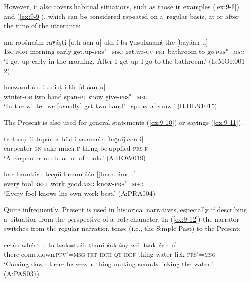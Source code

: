 However, it also covers habitual situations, such as those in examples (\ref{ex:9-8}) and (\ref{ex:9-9}), which can be considered repeated on a~regular basis, at or after the time of the utterance: 

\begin{exe}
\ex
\label{ex:9-8}
\gll ma roošnaám raɣáṣṭi [uth-áan-u] uth-í ba ɣusulxaaná the [bayáan-u] \\
\textsc{1sg.nom} morning early get.up-\textsc{prs"=msg} get.up-\textsc{cv}  \textsc{prt} bathroom to go.\textsc{prs"=msg} \\
\glt `I get up early in the morning. After I get up I go to the bathroom.' (B:MOR001-2)

\ex
\label{ex:9-9}
\gll heewand-á dúu diṣṭ-í kir [d-áan-u] \\
winter-\textsc{ob} two hand.span-\textsc{pl} snow give-\textsc{prs"=msg} \\
\glt `In the winter we [usually] get two hand"=spans of snow.' (B:HLN1015)
\end{exe}

The Present is also used for general statements (\ref{ex:9-10}) or sayings (\ref{ex:9-11}).

\begin{exe}
\ex
\label{ex:9-10}
\gll tarkaaṇ-íi dapáara bíiḍ-i saamaán [laɡaiǰ-éen-i]  \\
carpenter-\textsc{gn} sake much-\textsc{f} thing be.applied-\textsc{prs-f} \\
\glt `A carpenter needs a~lot of tools.' (A:HOW019)

\ex
\label{ex:9-11}
\gll har kaantíiru teeṇíi kráam šóo [ǰhaan-áan-u] \\
every fool \textsc{refl} work good.\textsc{msg} know-\textsc{prs"=msg} \\
\glt `Every fool knows his own work best.' (A:PRA004)
\end{exe}

Quite infrequently, Present is used in historical narratives, especially if describing a~situation from the perspective of a~role character. In (\ref{ex:9-12}) the narrator switches from the regular narration tense (i.e., the Simple Past) to the Present:

\begin{exe}
\ex
\label{ex:9-12}
\gll eetáa wháat-u ta tsak=tsák thaní áak šay wíi [tsak-áan-u] \\
there come.down.\textsc{pfv"=msg} \textsc{prt} \textsc{idph} \textsc{qt} \textsc{idef}  thing water lick-\textsc{prs"=msg}\\
\glt `Coming down there he sees a~thing making sounds licking the water.' (A:PAS037)
\end{exe}

